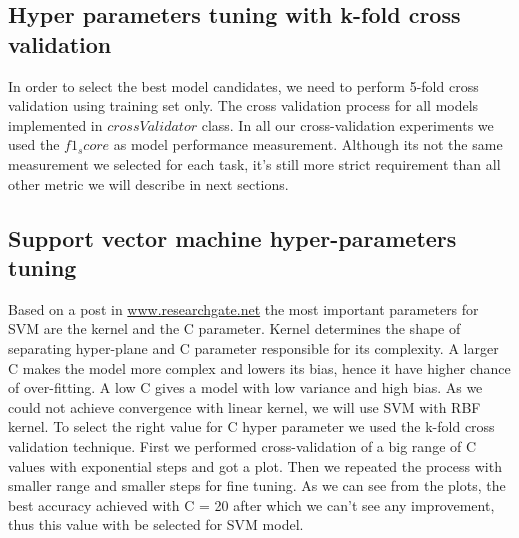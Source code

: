 \documentclass[12pt]{article}
\begin{document}
\subsection{Hyper parameters tuning with k-fold cross validation}
In order to select the best model candidates, we need to perform 5-fold cross validation using training set only. The cross validation process for all models implemented in $crossValidator$ class. In all our cross-validation experiments we used the $f1_score$ as model performance measurement. Although its not the same measurement we selected for each task, it's still more strict requirement than all other metric we will describe in next sections.

\subsection{Support vector machine hyper-parameters tuning}
Based on a post in  \href{https://www.researchgate.net/post/Is_it_necessary_to_choose_kernels_in_SVM_according_to_application}{www.researchgate.net} the most important parameters for SVM are the kernel and the C parameter. Kernel determines the shape of separating hyper-plane and C parameter responsible for its complexity. A larger C makes the model more complex and lowers its bias, hence it have higher chance of over-fitting. A low C gives a model with low variance and high bias. As we could not achieve convergence with linear kernel, we will use SVM with RBF kernel. To select the right value for C hyper parameter we used the k-fold cross validation technique. First we performed cross-validation of a big range of C values with exponential steps and got a plot. Then we repeated the process with smaller range and smaller steps for fine tuning. As we can see from the plots, the best accuracy achieved with C = 20 after which we can't see any improvement, thus this value with be selected for SVM model.
\end{document}
